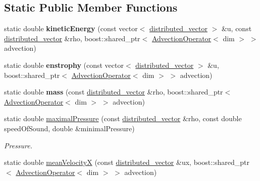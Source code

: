 \subsection*{Static Public Member Functions}
\begin{DoxyCompactItemize}
\item 
\hypertarget{classnatrium_1_1PhysicalProperties_a153e1a29848b78871687c2399f6a12f0}{
static double {\bfseries kineticEnergy} (const vector$<$ \hyperlink{namespacenatrium_a903d2b92917f582f2ff05f52160ab811}{distributed\_\-vector} $>$ \&u, const \hyperlink{namespacenatrium_a903d2b92917f582f2ff05f52160ab811}{distributed\_\-vector} \&rho, boost::shared\_\-ptr$<$ \hyperlink{classnatrium_1_1AdvectionOperator}{AdvectionOperator}$<$ dim $>$ $>$ advection)}
\label{classnatrium_1_1PhysicalProperties_a153e1a29848b78871687c2399f6a12f0}

\item 
\hypertarget{classnatrium_1_1PhysicalProperties_a39e4937cb2d9989077f58f41d34fd149}{
static double {\bfseries enstrophy} (const vector$<$ \hyperlink{namespacenatrium_a903d2b92917f582f2ff05f52160ab811}{distributed\_\-vector} $>$ \&u, boost::shared\_\-ptr$<$ \hyperlink{classnatrium_1_1AdvectionOperator}{AdvectionOperator}$<$ dim $>$ $>$ advection)}
\label{classnatrium_1_1PhysicalProperties_a39e4937cb2d9989077f58f41d34fd149}

\item 
\hypertarget{classnatrium_1_1PhysicalProperties_a54ac981f3647685a02316b82b93099a8}{
static double {\bfseries mass} (const \hyperlink{namespacenatrium_a903d2b92917f582f2ff05f52160ab811}{distributed\_\-vector} \&rho, boost::shared\_\-ptr$<$ \hyperlink{classnatrium_1_1AdvectionOperator}{AdvectionOperator}$<$ dim $>$ $>$ advection)}
\label{classnatrium_1_1PhysicalProperties_a54ac981f3647685a02316b82b93099a8}

\item 
\hypertarget{classnatrium_1_1PhysicalProperties_ab7610e7ba47e6ff4ef73c4b6071d67e9}{
static double \hyperlink{classnatrium_1_1PhysicalProperties_ab7610e7ba47e6ff4ef73c4b6071d67e9}{maximalPressure} (const \hyperlink{namespacenatrium_a903d2b92917f582f2ff05f52160ab811}{distributed\_\-vector} \&rho, const double speedOfSound, double \&minimalPressure)}
\label{classnatrium_1_1PhysicalProperties_ab7610e7ba47e6ff4ef73c4b6071d67e9}

\begin{DoxyCompactList}\small\item\em Pressure. \item\end{DoxyCompactList}\item 
\hypertarget{classnatrium_1_1PhysicalProperties_a2b4446026df3dc765c81ef4f9ae7ed78}{
static double \hyperlink{classnatrium_1_1PhysicalProperties_a2b4446026df3dc765c81ef4f9ae7ed78}{meanVelocityX} (const \hyperlink{namespacenatrium_a903d2b92917f582f2ff05f52160ab811}{distributed\_\-vector} \&ux, boost::shared\_\-ptr$<$ \hyperlink{classnatrium_1_1AdvectionOperator}{AdvectionOperator}$<$ dim $>$ $>$ advection)}
\label{classnatrium_1_1PhysicalProperties_a2b4446026df3dc765c81ef4f9ae7ed78}


\end{DoxyCompactItemize}
